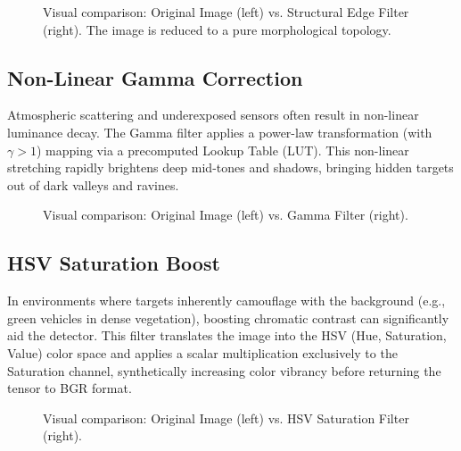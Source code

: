 \begin{figure}[hbt!]
    \centering
    \caption{Visual comparison: Original Image (left) vs. Structural Edge Filter (right). The image is reduced to a pure morphological topology.}
    \label{fig:filter_structural_edge}
\end{figure}

\subsection{Non-Linear Gamma Correction}
Atmospheric scattering and underexposed sensors often result in non-linear luminance decay. The Gamma filter applies a power-law transformation (with $\gamma > 1$) mapping via a precomputed Lookup Table (LUT). This non-linear stretching rapidly brightens deep mid-tones and shadows, bringing hidden targets out of dark valleys and ravines.

\begin{figure}[hbt!]
    \centering
    \caption{Visual comparison: Original Image (left) vs. Gamma Filter (right).}
    \label{fig:filter_gamma}
\end{figure}

\subsection{HSV Saturation Boost}
In environments where targets inherently camouflage with the background (e.g., green vehicles in dense vegetation), boosting chromatic contrast can significantly aid the detector. This filter translates the image into the HSV (Hue, Saturation, Value) color space and applies a scalar multiplication exclusively to the Saturation channel, synthetically increasing color vibrancy before returning the tensor to BGR format.

\begin{figure}[hbt!]
    \centering
    \caption{Visual comparison: Original Image (left) vs. HSV Saturation Filter (right).}
    \label{fig:filter_hsv}
\end{figure}

